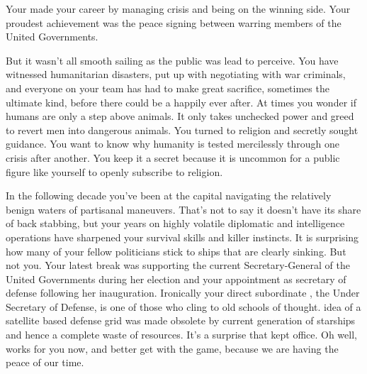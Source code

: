 \documentclass[char]{guildcamp3}
\begin{document}
\name{\cPoliOne{}}






Your made your career by managing crisis and being on the winning side. Your proudest achievement was the peace signing between warring members of the United Governments.  

But it wasn't all smooth sailing as the public was lead to perceive. You have witnessed humanitarian disasters, put up with negotiating with war criminals, and everyone on your team has had to make great sacrifice, sometimes the ultimate kind, before there could be a happily ever after. At times you wonder if humans are only a step above animals. It only takes unchecked power and greed to revert men into dangerous animals. You turned to religion and secretly sought guidance. You want to know why humanity is tested mercilessly through one crisis after another. You keep it a secret because it is uncommon for a public figure like yourself to openly subscribe to religion. 

In the following decade you've been at the capital navigating the relatively benign waters of partisanal maneuvers. That's not to say it doesn't have its share of back stabbing, but your years on highly volatile diplomatic and intelligence operations have sharpened your survival skills and killer instincts. It is surprising how many of your fellow politicians stick to ships that are clearly sinking. But not you. Your latest break was supporting the current Secretary-General of the United Governments during her election and your appointment as secretary of defense following her inauguration. Ironically your direct subordinate \cPoliTwo{\intro}, the Under Secretary of Defense, is one of those who cling to old schools of thought. \cPoliTwo{\Their} idea of a satellite based defense grid was made obsolete by current generation of starships and hence a complete waste of resources. It's a surprise that  kept  office. Oh well,  works for you now, and  better get with the game, because we are having the peace of our time.
\end{document}
